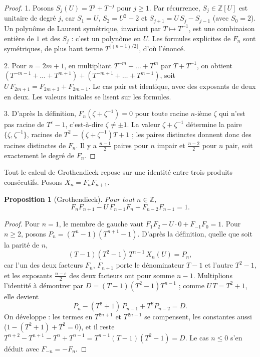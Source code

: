 \documentclass[11pt,a4paper]{article}
\theoremstyle{plain}
\newtheorem{proposition}[theoreme]{Proposition}
\theoremstyle{definition}
\theoremstyle{remark}
\newcommand{\Z}{\mathbb{Z}}
\begin{document}
\begin{proof}
1. Posons $S_j(U)=T^j+T^{-j}$ pour $j\geq1$. Par récurrence, $S_j\in\Z[U]$ est unitaire de degré $j$, car $S_1=U$, $S_2=U^2-2$ et $S_{j+1}=U\,S_j-S_{j-1}$ (avec $S_0=2$). Un polynôme de Laurent symétrique, invariant par $T\mapsto T^{-1}$, est une combinaison entière de $1$ et des $S_j$ : c'est un polynôme en $U$. Les formules explicites de $F_n$ sont symétriques, de plus haut terme $T^{\lfloor(n-1)/2\rfloor}$, d'où l'énoncé.

2. Pour $n=2m+1$, en multipliant $T^{-m}+\dots+T^m$ par $T+T^{-1}$, on obtient $(T^{-m-1}+\dots+T^{m+1})+(T^{-m+1}+\dots+T^{m-1})$, soit $U\,F_{2m+1}=F_{2m+3}+F_{2m-1}$. Le cas pair est identique, avec des exposants de deux en deux. Les valeurs initiales se lisent sur les formules.

3. D'après la définition, $F_n(\zeta+\zeta^{-1})=0$ pour toute racine $n$-ième $\zeta$ qui n'est pas racine de $T^\varepsilon-1$, c'est-à-dire $\zeta\neq\pm1$. La valeur $\zeta+\zeta^{-1}$ détermine la paire $\{\zeta,\zeta^{-1}\}$, racines de $T^2-(\zeta+\zeta^{-1})T+1$ ; les paires distinctes donnent donc des racines distinctes de $F_n$. Il y a $\frac{n-1}2$ paires pour $n$ impair et $\frac{n-2}2$ pour $n$ pair, soit exactement le degré de $F_n$.
\end{proof}

Tout le calcul de Grothendieck repose sur une identité entre trois produits consécutifs. Posons $X_n=F_nF_{n+1}$.

\begin{proposition}[Grothendieck]\label{prop:identite}
Pour tout $n\in\Z$,
\[
  F_nF_{n+1}-U\,F_{n-1}F_n+F_{n-2}F_{n-1}=1 .
\]
\end{proposition}

\begin{proof}
Pour $n=1$, le membre de gauche vaut $F_1F_2-U\cdot0+F_{-1}F_0=1$. Pour $n\geq2$, posons $P_n=(T^n-1)(T^{n+1}-1)$. D'après la définition, quelle que soit la parité de $n$,
\[
  (T-1)(T^2-1)\,T^{n-1}\,X_n(U)=P_n ,
\]
car l'un des deux facteurs $F_n$, $F_{n+1}$ porte le dénominateur $T-1$ et l'autre $T^2-1$, et les exposants $\frac{n-\varepsilon}2$ des deux facteurs ont pour somme $n-1$. Multiplions l'identité à démontrer par $D=(T-1)(T^2-1)T^{n-1}$ ; comme $U\,T=T^2+1$, elle devient
\[
  P_n-(T^2+1)\,P_{n-1}+T^2P_{n-2}=D .
\]
On développe : les termes en $T^{2n+1}$ et $T^{2n-1}$ se compensent, les constantes aussi ($1-(T^2+1)+T^2=0$), et il reste $T^{n+2}-T^{n+1}-T^n+T^{n-1}=T^{n-1}(T-1)(T^2-1)=D$. Le cas $n\leq0$ s'en déduit avec $F_{-n}=-F_n$.
\end{proof}
\end{document}
